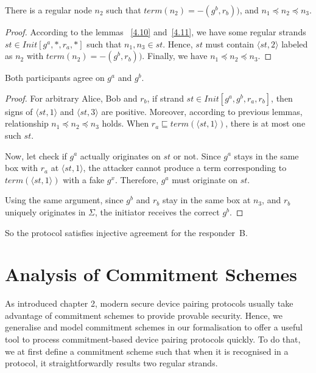 \begin{Lemma}\label{4.12}
There is a regular node $n_2$ such that $term(n_2)= -(g^b,r_b))$, and $n_1 \preceq n_2 \preceq n_3$.
\end{Lemma}

\begin{proof}
According to the lemmas ~\ref{4.10} and~\ref{4.11}, we have some regular strands $st \in Init[g^a,*, r_a,*]$ such that $n_1, n_3 \in st$. 
Hence, $st$ must contain $\langle st,2 \rangle$ labeled as $n_2$ with $term(n_2)= -(g^b,r_b))$. Finally, we have $n_1 \preceq n_2 \preceq n_3$.
\end{proof}

\begin{Lemma}\label{lemme4.13}
Both participants agree on $g^a$ and $g^b$. 
\end{Lemma}

\begin{proof}
For arbitrary Alice, Bob and $r_b$, if strand $st \in Init[g^a,g^b,r_a,r_b]$, then signs of $\langle st,1 \rangle$ and $\langle st,3 \rangle$ are positive. Moreover, according to previous lemmas, relationship $n_1 \preceq n_2 \preceq n_3$ holds. When $r_a \sqsubseteq term(\langle st,1 \rangle )$, there is at most one such $st$.

Now, let check if $g^a$ actually originates on $st$ or not. Since $g^a$ stays in the same box with $r_a$ at $\langle st,1 \rangle$, the attacker cannot produce a term corresponding to $term(\langle st,1 \rangle )$ with a fake $g^{x}$. Therefore, $g^a$ must originate on $st$. 

Using the same argument, since $g^b$ and $r_b$ stay in the same box at $n_3$, and $r_b$ uniquely originates in $\Sigma$, the initiator receives the correct $g^b$.
\end{proof}

So the protocol satisfies injective agreement for the responder~B. 

\section{Analysis of Commitment Schemes}

As introduced chapter 2, modern secure device pairing protocols usually take advantage of commitment schemes to provide provable security. Hence, we generalise and model commitment schemes in our formalisation to offer a useful tool to process commitment-based device pairing protocols quickly. To do that, we at first define a commitment scheme such that when it is recognised in a protocol, it straightforwardly results two regular strands. 

